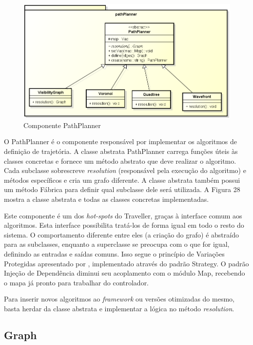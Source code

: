 \begin{figure}[h]
	\centering
	\label{fig28}
		\includegraphics[keepaspectratio=true,scale=0.5]{figuras/pkgpathplanner.png}
	\caption{Componente PathPlanner}
\end{figure}

O PathPlanner é o componente responsável por implementar os algoritmos de definição de trajetória. A classe abstrata PathPlanner carrega funções úteis às classes concretas e fornece um método abstrato que deve realizar o algoritmo. Cada subclasse sobrescreve \textit{resolution} (responsável pela execução do algoritmo) e métodos específicos e cria um grafo diferente. A classe abstrata também possui um método Fábrica para definir qual subclasse dele será utilizada. A Figura 28 mostra a classe abstrata e todas as classes concretas implementadas.

Este componente é um dos \textit{hot-spots} do Traveller, graças à interface comum aos algoritmos. Esta interface possibilita tratá-los de forma igual em todo o resto do sistema. O comportamento diferente entre eles (a criação do grafo) é abstraído para as subclasses, enquanto a superclasse se preocupa com o que for igual, definindo as entradas e saídas comuns. Isso segue o princípio de Variações Protegidas apresentado por \cite{Larman2005}, implementado através do padrão Strategy. O padrão Injeção de Dependência diminui seu acoplamento com o módulo Map, recebendo o mapa já pronto para trabalhar do controlador.

Para inserir novos algoritmos ao \textit{framework} ou versões otimizadas do mesmo, basta herdar da classe abstrata e implementar a lógica no método \textit{resolution}.

\subsection{Graph}

